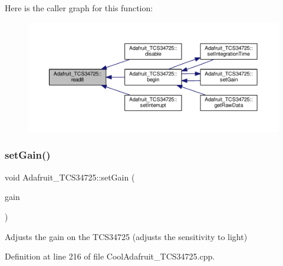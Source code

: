 Here is the caller graph for this function\+:\nopagebreak
\begin{figure}[H]
\begin{center}
\leavevmode
\includegraphics[width=350pt]{class_adafruit___t_c_s34725_a3ffafbdd475d6baf9abda8dd067b5319_icgraph}
\end{center}
\end{figure}
\mbox{\label{class_adafruit___t_c_s34725_a6be06315a9d33f76e44550f574f023a5}} 
\subsubsection{\texorpdfstring{set\+Gain()}{setGain()}}
{\footnotesize\ttfamily void Adafruit\+\_\+\+T\+C\+S34725\+::set\+Gain (\begin{DoxyParamCaption}\item[{\hyperlink{_cool_adafruit___t_c_s34725_8h_a23611ba111ac38012551332ee7189f9a}{tcs34725\+Gain\+\_\+t}}]{gain }\end{DoxyParamCaption})}

Adjusts the gain on the T\+C\+S34725 (adjusts the sensitivity to light) 

Definition at line 216 of file Cool\+Adafruit\+\_\+\+T\+C\+S34725.\+cpp.

